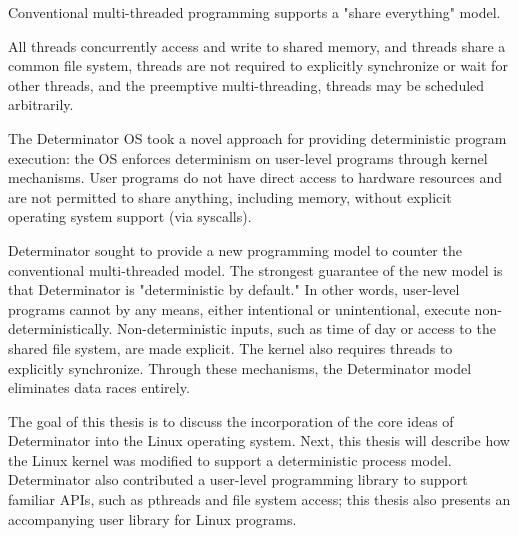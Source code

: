 Conventional multi-threaded programming supports a "share everything" model.

All threads concurrently access and write to shared memory, and threads share a
common file system, threads are not required to explicitly synchronize or wait
for other threads, and the preemptive multi-threading, threads may be scheduled
arbitrarily.

The Determinator OS took a novel approach for providing deterministic program
execution: the OS enforces determinism on user-level programs through kernel
mechanisms. User programs do not have direct access to hardware resources and
are not permitted to share anything, including memory, without explicit
operating system support (via syscalls).

Determinator sought to provide a new programming model to counter the
conventional multi-threaded model. The strongest guarantee of the new model
is that Determinator is "deterministic by default." In other words, user-level
programs cannot by any means, either intentional or unintentional, execute
non-deterministically. Non-deterministic inputs, such as time of day or access
to the shared file system, are made explicit. The kernel also requires threads
to explicitly synchronize. Through these mechanisms, the Determinator model
eliminates data races entirely.

The goal of this thesis is to discuss the incorporation of the core ideas of
Determinator into the Linux operating system. Next, this thesis will describe
how the Linux kernel was modified to support a deterministic process model.
Determinator also contributed a user-level programming library to support
familiar APIs, such as pthreads and file system access; this thesis also
presents an accompanying user library for Linux programs.

\fi
\endinput


